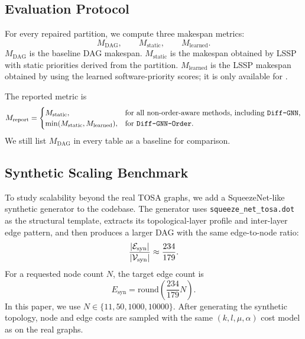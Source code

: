 \subsection{Evaluation Protocol}
For every repaired partition, we compute three makespan metrics:
\begin{equation}
M_{\mathrm{DAG}}, \qquad M_{\mathrm{static}}, \qquad M_{\mathrm{learned}}.
\end{equation}
$M_{\mathrm{DAG}}$ is the baseline DAG makespan. $M_{\mathrm{static}}$ is the makespan obtained by LSSP with static priorities derived from the partition. $M_{\mathrm{learned}}$ is the LSSP makespan obtained by using the learned software-priority scores; it is only available for \diffgnnorder.

The reported metric is
\begin{equation}
M_{\mathrm{report}}=
\begin{cases}
M_{\mathrm{static}}, & \text{for all non-order-aware methods, including \texttt{Diff-GNN},}\\
\min(M_{\mathrm{static}},M_{\mathrm{learned}}), & \text{for \texttt{Diff-GNN-Order}.}
\end{cases}
\end{equation}
We still list $M_{\mathrm{DAG}}$ in every table as a baseline for comparison.

\subsection{Synthetic Scaling Benchmark}
To study scalability beyond the real TOSA graphs, we add a SqueezeNet-like synthetic generator to the codebase. The generator uses \texttt{squeeze\_net\_tosa.dot} as the structural template, extracts its topological-layer profile and inter-layer edge pattern, and then produces a larger DAG with the same edge-to-node ratio:
\begin{equation}
\frac{|\mathcal{E}_{\mathrm{syn}}|}{|\mathcal{V}_{\mathrm{syn}}|}
\approx
\frac{234}{179}.
\end{equation}
For a requested node count $N$, the target edge count is
\begin{equation}
E_{\mathrm{syn}} = \mathrm{round}\!\left(\frac{234}{179}N\right).
\end{equation}
In this paper, we use $N\in\{11,50,1000,10000\}$. After generating the synthetic topology, node and edge costs are sampled with the same $(k,l,\mu,\alpha)$ cost model as on the real graphs.

